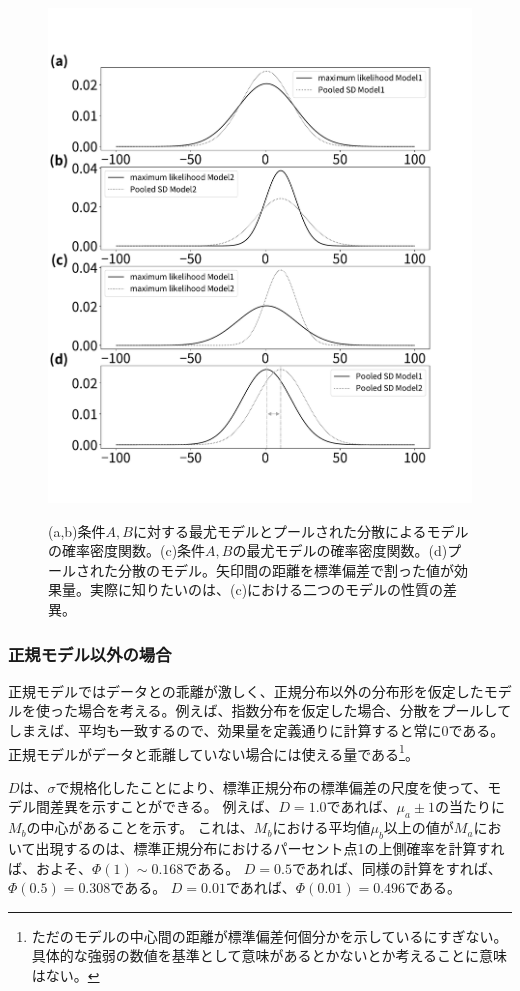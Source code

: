 \begin{figure}
 \begin{center}
  \includegraphics[width=12cm]{./image/12_/cohen_d_pooled_std_model.pdf}
  \label{fig:cohen_d_pooled_std_model}
  \caption{(a,b)条件$A,B$に対する最尤モデルとプールされた分散によるモデルの確率密度関数。(c)条件$A,B$の最尤モデルの確率密度関数。(d)プールされた分散のモデル。矢印間の距離を標準偏差で割った値が効果量。実際に知りたいのは、(c)における二つのモデルの性質の差異。}
 \end{center}
\end{figure}

\subsubsection{正規モデル以外の場合}
正規モデルではデータとの乖離が激しく、正規分布以外の分布形を仮定したモデルを使った場合を考える。例えば、指数分布を仮定した場合、分散をプールしてしまえば、平均も一致するので、効果量を定義通りに計算すると常に$0$である。正規モデルがデータと乖離していない場合には使える量である\footnote{ただのモデルの中心間の距離が標準偏差何個分かを示しているにすぎない。具体的な強弱の数値を基準として意味があるとかないとか考えることに意味はない。}。


$D$は、$\sigma$で規格化したことにより、標準正規分布の標準偏差の尺度を使って、モデル間差異を示すことができる。
例えば、$D=1.0$であれば、$\mu_a\pm 1$の当たりに$M_b$の中心があることを示す。
これは、$M_b$における平均値$\mu_b$以上の値が$M_a$において出現するのは、標準正規分布におけるパーセント点1の上側確率を計算すれば、およそ、$\varPhi(1)\sim0.168$である。
$D=0.5$であれば、同様の計算をすれば、$\varPhi(0.5)=0.308$である。
$D=0.01$であれば、$\varPhi(0.01)=0.496$である。
\fi


